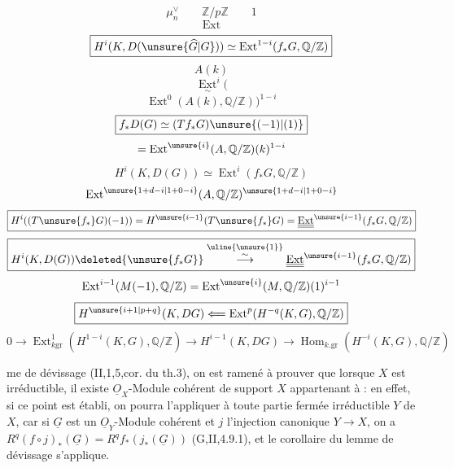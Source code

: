 \[
\mu_n^\vee\qquad\mathbb Z/p\mathbb Z\qquad1
\]
\[
\operatorname{Ext}
\]
\[
\boxed{H^i(K,D(\unsure{\widehat G|G}))\simeq
\operatorname{Ext}^{1-i}(f_*G,\mathbb Q/\mathbb Z)}
\]
\[
A(k)
\]
\[
\underset{\sim}{\operatorname{Ext}}^i(
\]
\[
\operatorname{Ext}^0(A(k),\mathbb Q/\mathbb Z))^{1-i}
\]
\[
\boxed{f_*D(G)\simeq(Tf_*G)\unsure{(-1)|(1)}}
\]
\[
=\operatorname{Ext}^{\unsure{i}}(A,\mathbb Q/\mathbb Z)(k)^{1-i}
\]
\[
H^i(K,D(G))\simeq\operatorname{Ext}^i(f_*G,\mathbb Q/\mathbb Z)
\]
\[
\operatorname{Ext}^{\unsure{1+d-i|1+0-i}}(A,\mathbb Q/\mathbb Z)^{\unsure{1+d-i|1+0-i}}
\]
\[
\boxed{H^i((T\unsure{f_*}G)(-1))=H^{\unsure{i-1}}(T\unsure{f_*}G)
=\underline{\underline{\operatorname{Ext}}}^{\unsure{i-1}}(f_*G,\mathbb Q/\mathbb Z)}
\]
\[
\boxed{H^i(K,D(G))\deleted{\unsure{f_*G}}
\overset{\uline{\unsure{1}}}{\overset{\sim}{\longrightarrow}}
\underline{\underline{\operatorname{Ext}}}^{\unsure{i-1}}(f_*G,\mathbb Q/\mathbb Z)}
\]
\[
\operatorname{Ext}^{i-1}(M(-1),\mathbb Q/\mathbb Z)
=\operatorname{Ext}^{\unsure{i}}(M,\mathbb Q/\mathbb Z)(1)^{i-1}
\]
\[
\boxed{H^{\unsure{i+1|p+q}}(K,DG)\Longleftarrow
\operatorname{Ext}^{p}(H^{-q}(K,G),\mathbb Q/\mathbb Z)}
\]
\[
0\longrightarrow\operatorname{Ext}^{1}_{k\mathrm{gr}}(H^{1-i}(K,G),\mathbb Q/\mathbb Z)
\longrightarrow H^{i-1}(K,DG)\longrightarrow
\operatorname{Hom}_{k.\mathrm{gr}}(H^{-i}(K,G),\mathbb Q/\mathbb Z)
\]

me de dévissage (II,1,5,cor. du th.3), on est ramené à prouver que
lorsque $X$ est irréductible, il existe  $\underline O_X$-Module cohérent de support
$X$ appartenant à : en effet, si ce point est établi, on
pourra l'appliquer à toute partie fermée irréductible $Y$ de $X$, car
si $\underline G$ est un $\underline O_Y$-Module cohérent et $j$ l'injection canonique $Y\to X$, on
a $R^q(f\circ j)_*(\underline G)=R^qf_*(j_*(\underline G))$ (G,II,4.9.1), et le corollaire du lemme
de dévissage s'applique.

